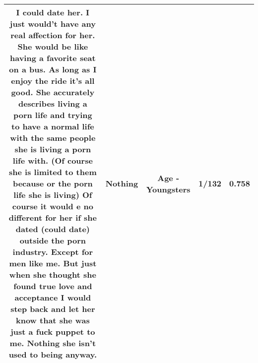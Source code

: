 \documentclass[11pt]{article}
\newlength\mylength
\begin{document}
\begin{center}
\begin{longtable}{|C{.65\mylength}|C{.30\mylength}|C{.12\mylength}|C{.12\mylength}|C{.12\mylength}|}
  \small I could date her. I just would't have any real affection for her. She would be like having a favorite seat on a bus. As long as I enjoy the ride it's all good. She accurately describes living a porn life and trying to have a normal life with the same people she is living a porn life with. (Of course she is limited to them because or the porn life she is living) Of course it would e no different for her if she dated (could date) outside the porn industry. Except for men like me. But just when she thought she found true love and acceptance I would step back and let her know that she was just a fuck puppet to me. \textbf{Nothing} she isn't used to being anyway.\normalsize   & Nothing & Age - Youngsters & 1/132 & 0.758 \\  \hline

\end{longtable}
\end{center}
\end{document}
